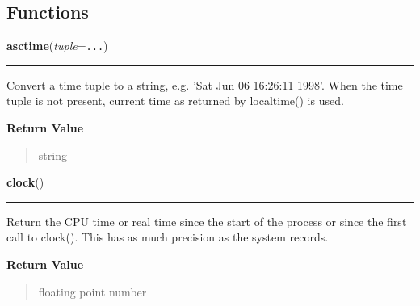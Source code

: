 
  \subsection{Functions}

    \label{time:asctime}

    \vspace{0.5ex}

\hspace{.8\funcindent}\begin{boxedminipage}{\funcwidth}

    \raggedright \textbf{asctime}(\textit{tuple}={\tt ...})

    \vspace{-1.5ex}

    \rule{\textwidth}{0.5\fboxrule}
\setlength{\parskip}{2ex}
    Convert a time tuple to a string, e.g. 'Sat Jun 06 16:26:11 1998'. When
    the time tuple is not present, current time as returned by localtime() 
    is used.

\setlength{\parskip}{1ex}
      \textbf{Return Value}
    \vspace{-1ex}

      \begin{quote}
      string

      \end{quote}

    \end{boxedminipage}

    \label{time:clock}

    \vspace{0.5ex}

\hspace{.8\funcindent}\begin{boxedminipage}{\funcwidth}

    \raggedright \textbf{clock}()

    \vspace{-1.5ex}

    \rule{\textwidth}{0.5\fboxrule}
\setlength{\parskip}{2ex}
    Return the CPU time or real time since the start of the process or 
    since the first call to clock().  This has as much precision as the 
    system records.

\setlength{\parskip}{1ex}
      \textbf{Return Value}
    \vspace{-1ex}

      \begin{quote}
      floating point number

      \end{quote}

    \end{boxedminipage}

